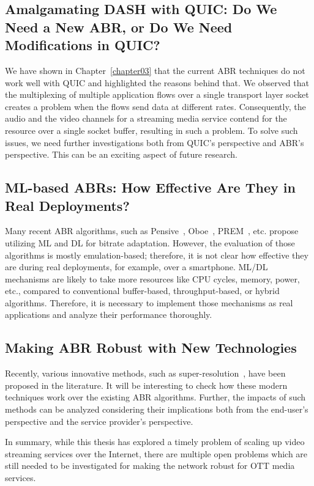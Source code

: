 \subsection{Amalgamating DASH with QUIC: Do We Need a New ABR, or Do We Need Modifications in QUIC?}
We have shown in Chapter~\ref{chapter03} that the current ABR techniques do not work well with QUIC and highlighted the reasons behind that. We observed that the multiplexing of multiple application flows over a single transport layer socket creates a problem when the flows send data at different rates. Consequently, the audio and the video channels for a streaming media service contend for the resource over a single socket buffer, resulting in such a problem. To solve such issues, we need further investigations both from QUIC's perspective and ABR's perspective. This can be an exciting aspect of future research. 

\subsection{ML-based ABRs: How Effective Are They in Real Deployments?}
Many recent ABR algorithms, such as Pensive~\cite{mao2017neural}, Oboe~\cite{Akhtar2018}, PREM~\cite{9155492}, etc. propose utilizing ML and DL for bitrate adaptation. However, the evaluation of those algorithms is mostly emulation-based; therefore, it is not clear how effective they are during real deployments, for example, over a smartphone. ML/DL mechanisms are likely to take more resources like CPU cycles, memory, power, etc., compared to conventional buffer-based, throughput-based, or hybrid algorithms. Therefore, it is necessary to implement those mechanisms as real applications and analyze their performance thoroughly.   

\subsection{Making ABR Robust with New Technologies}
Recently, various innovative methods, such as super-resolution~\cite{9155384}, have been proposed in the literature. It will be interesting to check how these modern techniques work over the existing ABR algorithms. Further, the impacts of such methods can be analyzed considering their implications both from the end-user's perspective and the service provider's perspective. 


In summary, while this thesis has explored a timely problem of scaling up video streaming services over the Internet, there are multiple open problems which are still needed to be investigated for making the network robust for OTT media services. 